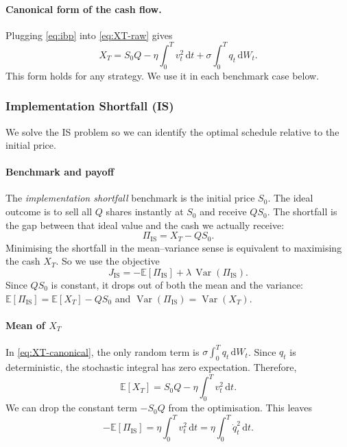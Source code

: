 \documentclass[12pt, a4paper]{article}
\newcommand{\E}{\mathbb{E}}
\newcommand{\Var}{\operatorname{Var}}
\newcommand{\dd}{\,\mathrm{d}}
\begin{document}
\paragraph{Canonical form of the cash flow.}
Plugging \eqref{eq:ibp} into \eqref{eq:XT-raw} gives
\begin{equation}
  X_T = S_0 Q - \eta\!\int_0^T v_t^2 \dd t + \sigma\!\int_0^T q_t \dd W_t.
  \label{eq:XT-canonical}
\end{equation}
This form holds for any strategy.
We use it in each benchmark case below.

\subsubsection{Implementation Shortfall (IS)}
\label{sec:IS}

We solve the IS problem so we can identify the optimal schedule relative to the initial price.

\paragraph{Benchmark and payoff}

The \emph{implementation shortfall} benchmark is the initial price $S_0$.
The ideal outcome is to sell all $Q$ shares instantly at $S_0$ and receive $QS_0$.
The shortfall is the gap between that ideal value and the cash we actually receive:
\[
  \Pi_{\mathrm{IS}} = X_T - QS_0.
\]
Minimising the shortfall in the mean--variance sense is equivalent to maximising the cash $X_T$.
So we use the objective
\[
  J_{\mathrm{IS}} = -\E[\Pi_{\mathrm{IS}}] + \lambda\,\Var(\Pi_{\mathrm{IS}}).
\]
Since $QS_0$ is constant, it drops out of both the mean and the variance:
$\E[\Pi_{\mathrm{IS}}] = \E[X_T] - QS_0$ and $\Var(\Pi_{\mathrm{IS}}) = \Var(X_T)$.

\paragraph{Mean of \texorpdfstring{$X_T$}{XT}}

In \eqref{eq:XT-canonical}, the only random term is $\sigma\int_0^T q_t \dd W_t$.
Since $q_t$ is deterministic, the stochastic integral has zero expectation.
Therefore,
\[
  \E[X_T] = S_0 Q - \eta\!\int_0^T v_t^2 \dd t.
\]
We can drop the constant term $-S_0 Q$ from the optimisation.
This leaves
\[
  -\E[\Pi_{\mathrm{IS}}] = \eta\!\int_0^T v_t^2 \dd t = \eta\!\int_0^T \dot q_t^2 \dd t.
\]
\end{document}
